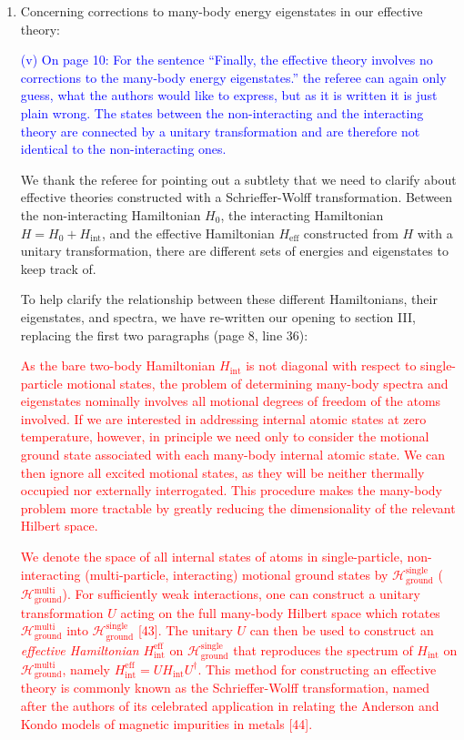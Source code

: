 \documentclass[preprint]{revtex4-1}
\renewcommand{\t}{\text} %
\renewcommand{\H}{\mathcal{H}}
\newcommand{\1}{\mathds{1}}
\newcommand{\blue}[1]{\textcolor{blue}{#1}}
\newcommand{\red}[1]{\textcolor{red}{#1}}
\begin{document}
\begin{enumerate}
\item Concerning corrections to many-body energy eigenstates in our
  effective theory:

  \blue{(v) On page 10: For the sentence ``Finally, the effective
    theory involves no corrections to the many-body energy
    eigenstates.'' the referee can again only guess, what the authors
    would like to express, but as it is written it is just plain
    wrong. The states between the non-interacting and the interacting
    theory are connected by a unitary transformation and are therefore
    not identical to the non-interacting ones. }

  We thank the referee for pointing out a subtlety that we need to
  clarify about effective theories constructed with a Schrieffer-Wolff
  transformation.  Between the non-interacting Hamiltonian $H_0$, the
  interacting Hamiltonian $H = H_0 + H_{\t{int}}$, and the effective
  Hamiltonian $H_{\t{eff}}$ constructed from $H$ with a unitary
  transformation, there are different sets of energies and eigenstates
  to keep track of.

  To help clarify the relationship between these different
  Hamiltonians, their eigenstates, and spectra, we have re-written our
  opening to section III, replacing the first two paragraphs (page 8,
  line 36):

  \red{As the bare two-body Hamiltonian $H_{\t{int}}$ is not diagonal
    with respect to single-particle motional states, the problem of
    determining many-body spectra and eigenstates nominally involves
    all motional degrees of freedom of the atoms involved.  If we are
    interested in addressing internal atomic states at zero
    temperature, however, in principle we need only to consider the
    motional ground state associated with each many-body internal
    atomic state.  We can then ignore all excited motional states, as
    they will be neither thermally occupied nor externally
    interrogated.  This procedure makes the many-body problem more
    tractable by greatly reducing the dimensionality of the relevant
    Hilbert space.}

  \red{We denote the space of all internal states of atoms in
    single-particle, non-interacting (multi-particle, interacting)
    motional ground states by $\H_{\t{ground}}^{\t{single}}$
    ($\H_{\t{ground}}^{\t{multi}}$).  For sufficiently weak
    interactions, one can construct a unitary transformation $U$
    acting on the full many-body Hilbert space which rotates
    $\H_{\t{ground}}^{\t{multi}}$ into $\H_{\t{ground}}^{\t{single}}$
    [43].  The unitary $U$ can then be used to construct an {\it
      effective Hamiltonian} $H_{\t{int}}^{\t{eff}}$ on
    $\H_{\t{ground}}^{\t{single}}$ that reproduces the spectrum of
    $H_{\t{int}}$ on $\H_{\t{ground}}^{\t{multi}}$, namely
    $H_{\t{int}}^{\t{eff}}=UH_{\t{int}}U^\dag$.  This method for
    constructing an effective theory is commonly known as the
    Schrieffer-Wolff transformation, named after the authors of its
    celebrated application in relating the Anderson and Kondo models
    of magnetic impurities in metals [44].}


\end{enumerate}
\end{document}
